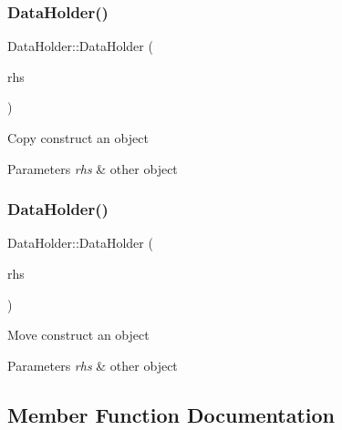 \subsubsection{\texorpdfstring{Data\+Holder()}{DataHolder()}\hspace{0.1cm}{\footnotesize\ttfamily [3/4]}}
{\footnotesize\ttfamily Data\+Holder\+::\+Data\+Holder (\begin{DoxyParamCaption}\item[{const \hyperlink{classDataHolder}{Data\+Holder} \&}]{rhs }\end{DoxyParamCaption})\hspace{0.3cm}{\ttfamily [default]}}

Copy construct an object 
\begin{DoxyParams}{Parameters}
{\em rhs} & other object \\
\hline
\end{DoxyParams}
\mbox{\label{classDataHolder_a6d1fdef9552e75f93c0174ec35a2fd57}} 
\subsubsection{\texorpdfstring{Data\+Holder()}{DataHolder()}\hspace{0.1cm}{\footnotesize\ttfamily [4/4]}}
{\footnotesize\ttfamily Data\+Holder\+::\+Data\+Holder (\begin{DoxyParamCaption}\item[{\hyperlink{classDataHolder}{Data\+Holder} \&\&}]{rhs }\end{DoxyParamCaption})\hspace{0.3cm}{\ttfamily [default]}}

Move construct an object 
\begin{DoxyParams}{Parameters}
{\em rhs} & other object \\
\hline
\end{DoxyParams}


\subsection{Member Function Documentation}
\mbox{\label{classDataHolder_a73bdc9101084dd53b22fdb40c877d10b}} 
